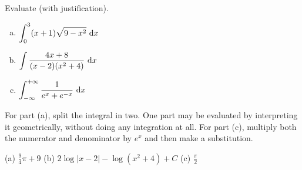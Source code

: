 \begin{question}[M121 2012A]
Evaluate (with justification).

\begin{enumerate}[(a)]
\item
$\displaystyle\int_0^3(x+1)\sqrt{9-x^2} \ \mathrm{d}x$
\item
$\displaystyle\int\frac{4x+8}{(x-2)(x^2+4)}\ \dee{x}$
\item
$\displaystyle\int_{-\infty}^{+\infty} \frac{1}{e^x+e^{-x}}\ \mathrm{d}x$
\end{enumerate}
\end{question}

\begin{hint}
For part (a), split the integral in two. One part may be evaluated
 by interpreting it geometrically, without doing any integration at all.
For part (c), multiply both the numerator and denominator by $e^x$
and then make a substitution.

\end{hint}

\begin{answer} (a)
$\displaystyle\frac{9}{4}\pi + 9
$
\qquad (b)
$\displaystyle2 \log |x-2| -  \log (x^2 + 4) + C$
\qquad (c)
$\displaystyle\frac{\pi}{2}$
\end{answer}

